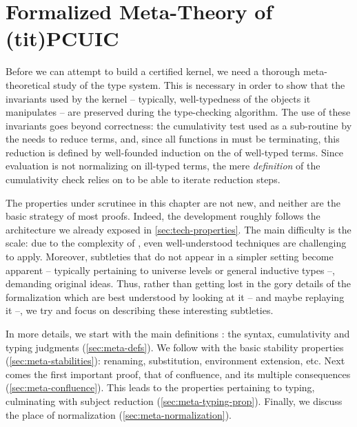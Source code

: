 
\chapter{Formalized Meta-Theory of \kl(tit){PCUIC}}
\label{chap:metacoq-general}

\margintoc

Before we can attempt to build a certified kernel, we need a thorough meta-theoretical study
of the type system. This is necessary in order to show that the invariants used by the kernel – typically, well-typedness of the objects it manipulates – 
are preserved during the type-checking algorithm.
The use of these invariants goes beyond correctness:
the cumulativity test used as a sub-routine by the  needs to reduce terms, and,
since all functions in  must be terminating,
this reduction is defined by well-founded induction on the 
of well-typed terms.
Since evaluation is not normalizing on ill-typed terms, the mere \emph{definition} of the
cumulativity check relies on  to be able to iterate reduction steps.

The properties under scrutinee in this chapter are not new,
and neither are the basic strategy of most proofs.
Indeed, the development roughly follows the architecture we already exposed in
\cref{sec:tech-properties}. The main difficulty is the scale: due to the
complexity of , even well-understood techniques are challenging to apply.
Moreover, subtleties that do not appear in a simpler setting become apparent –
typically pertaining to universe levels or general inductive types –,
demanding original ideas. Thus, rather than getting lost in
the gory details of the formalization which are best understood by looking at it
– and maybe replaying it –, we try and focus on describing these interesting subtleties.

In more details, we start with the main definitions : the syntax, cumulativity and typing
judgments (\cref{sec:meta-defs}). We follow with the basic
stability properties (\cref{sec:meta-stabilities}):
renaming, substitution, environment extension, etc.
Next comes the first important proof, that of confluence, and its multiple consequences
(\cref{sec:meta-confluence}). This leads to the properties pertaining to typing, culminating
with subject reduction (\cref{sec:meta-typing-prop}).
Finally, we discuss the place of normalization (\cref{sec:meta-normalization}).

